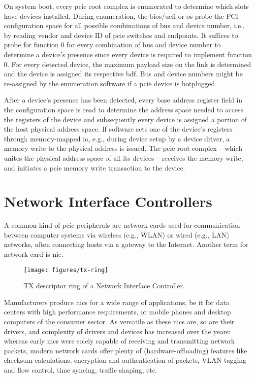 On system boot, every \ac{pcie} root complex is enumerated to determine which
slots have devices installed. During enumeration, the \acs{bios}/\acs{uefi} or
\ac{os} probe the PCI configuration space for all possible combinations of bus
and device number, i.e., by reading vendor and device ID of \ac{pcie} switches
and endpoints. It suffices to probe for function 0 for every combination of bus
and device number to determine a device's presence since every device is
required to implement function 0. For every detected device, the maximum payload
size on the link is determined and the device is assigned its respective
\ac{bdf}. Bus and device numbers might be re-assigned by the enumeration
software if a \ac{pcie} device is hotplugged.

After a device's presence has been detected, every base address register field
in the configuration space is read to determine the address space needed to
access the registers of the device and subsequently every device is assigned a
portion of the host physical address space. If software sets one of the device's
registers through memory-mapped \ac{io}, e.g., during device setup by a device
driver, a memory write to the physical address is issued. The \ac{pcie} root
complex -- which unites the physical address space of all its devices --
receives the memory write, and initiates a \ac{pcie} memory write transaction to
the device.


\section{Network Interface Controllers}
\label{sec:nics}

A common kind of \ac{pcie} peripherals are network cards used for communication
between computer systems via wireless (e.g., WLAN) or wired (e.g., LAN)
networks, often connecting hosts via a gateway to the Internet. Another term for
network card is \acf{nic}.

\begin{figure}[!b]
    \centering
    \texttt{[image: figures/tx-ring]}
    \caption{TX descriptor ring of a Network Interface Controller.}
    \label{fig:tx-ring}
\end{figure}

Manufacturers produce \acp{nic} for a wide range of applications, be it for data
centers with high performance requirements, or mobile phones and desktop
computers of the consumer sector. As versatile as these \acp{nic} are, so are
their drivers, and complexity of drivers and devices has increased over the
years: whereas early \acp{nic} were solely capable of receiving and transmitting
network packets, modern network cards offer plenty of (hardware-offloading)
features like checksum calculations, encryption and authentication of packets,
VLAN tagging and flow control, time syncing, traffic shaping, etc.

